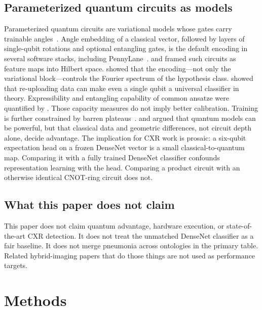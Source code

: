 \documentclass[11pt,a4paper]{article}
\begin{document}
\subsection{Parameterized quantum circuits as models}

Parameterized quantum circuits are variational models whose gates carry trainable angles~\citep{mitarai2018qcl,benedetti2019pqc,cerezo2021vqa}. Angle embedding of a classical vector, followed by layers of single-qubit rotations and optional entangling gates, is the default encoding in several software stacks, including PennyLane~\citep{bergholm2018pennylane}. \citet{schuld2019feature} and \citet{havlicek2019supervised} framed such circuits as feature maps into Hilbert space. \citet{schuld2021encoding} showed that the encoding---not only the variational block---controls the Fourier spectrum of the hypothesis class. \citet{perez2020reuploading} showed that re-uploading data can make even a single qubit a universal classifier in theory. Expressibility and entangling capability of common ansatze were quantified by \citet{sim2019expressibility}. Those capacity measures do not imply better calibration. Training is further constrained by barren plateaus~\citep{mcclean2018barren}. \citet{huang2021powerdata} and \citet{abbas2021power} argued that quantum models can be powerful, but that classical data and geometric differences, not circuit depth alone, decide advantage. The implication for CXR work is prosaic: a six-qubit expectation head on a frozen DenseNet vector is a small classical-to-quantum map. Comparing it with a fully trained DenseNet classifier confounds representation learning with the head. Comparing a product circuit with an otherwise identical CNOT-ring circuit does not.

\subsection{What this paper does not claim}

This paper does not claim quantum advantage, hardware execution, or state-of-the-art CXR detection. It does not treat the unmatched DenseNet classifier as a fair baseline. It does not merge pneumonia across ontologies in the primary table. Related hybrid-imaging papers that do those things are not used as performance targets.

\section{Methods}
\end{document}

